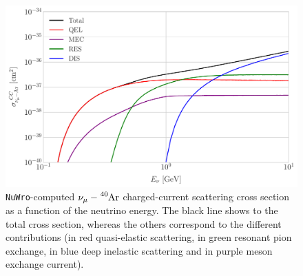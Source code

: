 \begin{figure}[t]
	\centering
	\includegraphics[width=0.9\linewidth]{Images/DM_Analysis/nu_Ar_xsection}
	\caption[\texttt{NuWro}-computed $\nu_{\mu}-\ce{^{40}Ar}$ charged-current scattering cross section as a function of the neutrino energy.]{\texttt{NuWro}-computed $\nu_{\mu}-\ce{^{40}Ar}$ charged-current scattering cross section as a function of the neutrino energy. The black line shows to the total cross section, whereas the others correspond to the different contributions (in red quasi-elastic scattering, in green resonant pion exchange, in blue deep inelastic scattering and in purple meson exchange current).}
	\label{fig:nu_Ar_xsection}
\end{figure}

